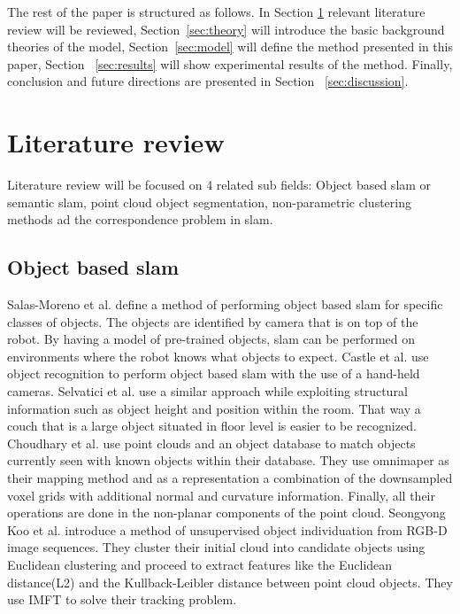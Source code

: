 \documentclass[]{article}
\begin{document}
The rest of the paper is structured as follows. In Section \ref{sec:literature} relevant literature review will be reviewed, Section~\ref{sec:theory} will introduce the basic background theories of the model, Section~\ref{sec:model} will define the method presented in this paper, Section ~\ref{sec:results} will show experimental results of the method. Finally, conclusion and future directions are presented in Section ~\ref{sec:discussion}.

\section{Literature review}
\label{sec:literature}
Literature review will be focused on 4 related sub fields: Object based slam or semantic slam, point cloud object segmentation, non-parametric clustering methods ad the correspondence problem in slam.

\subsection{Object based slam}
Salas-Moreno et al.\cite{slam++} define a method of performing object based slam for specific classes of objects. The objects are identified by camera that is on top of the robot. By having a model of pre-trained objects, slam can be performed on environments where the robot knows what objects to expect. 
Castle et al. use object recognition to perform object based slam with the use of a hand-held cameras. Selvatici et al.\cite{objslam} use a similar approach while exploiting structural information such as object height and position within the room. That way a couch that is a large object situated in floor level is easier to be recognized.
Choudhary et al.\cite{objectpointslam} use point clouds and an object database to match objects currently seen with known objects within their database. They use omnimaper\cite{omnimaper} as their mapping method and as a representation a combination of the downsampled  voxel grids with additional normal and curvature information.  Finally, all their operations are done in the non-planar components of the point cloud.
Seongyong Koo et al.\cite{objectDisc} introduce a method of unsupervised object individuation from RGB-D image sequences. They cluster their initial cloud into candidate objects using Euclidean clustering and proceed to extract features like the Euclidean distance(L2) and the Kullback-Leibler distance between point cloud objects. They use IMFT to solve their tracking problem.
\end{document}
